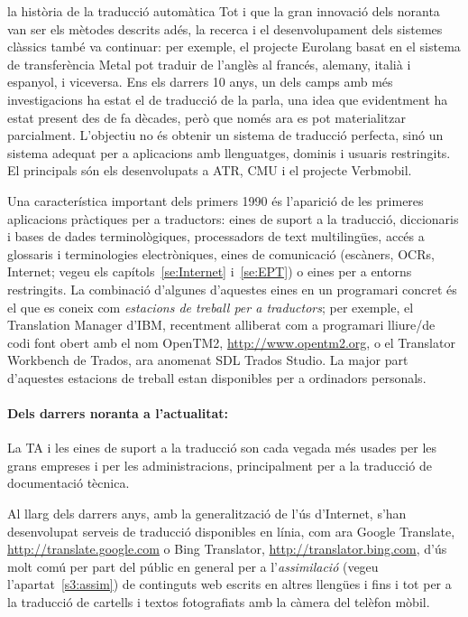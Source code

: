 \begin{persabermes}{la història de la traducció automàtica}
Tot i que la gran innovació dels noranta van ser els mètodes descrits
adés, la recerca i el desenvolupament dels sistemes clàssics també va
continuar: per exemple, el projecte Eurolang basat en el sistema de
transferència Metal pot traduir de l'anglès al francés, alemany,
italià i espanyol, i viceversa.  Ens els darrers 10 anys, un dels
camps amb més investigacions ha estat el de traducció de la parla, una
idea que evidentment ha estat present des de fa dècades, però que
només ara es pot materialitzar parcialment.  L'objectiu no és obtenir
un sistema de traducció perfecta, sinó un sistema adequat per a
aplicacions amb llenguatges, dominis i usuaris restringits. El
principals són els desenvolupats a ATR, CMU i el projecte Verbmobil.

Una característica important dels primers 1990 és l'aparició de les
primeres aplicacions pràctiques per a traductors: eines de suport a la
traducció, diccionaris i bases de dades terminològiques, processadors
de text multilingües, accés a glossaris i terminologies electròniques,
eines de comunicació (escàners, OCRs, Internet; vegeu els
capítols~\ref{se:Internet} i~\ref{se:EPT}) o eines per a entorns
restringits.  La combinació d'algunes d'aquestes eines en un
programari concret és el que es coneix com \emph{estacions de treball
  per a traductors}; per exemple, el Translation Manager d'IBM,
recentment alliberat com a programari lliure/de codi font obert amb el
nom OpenTM2, \url{http://www.opentm2.org}, o el Translator Workbench
de Trados, ara anomenat SDL Trados Studio. La major part d'aquestes estacions
de treball estan disponibles per a ordinadors personals.

\paragraph{Dels darrers noranta a l'actualitat:}

La TA i les eines de suport a la traducció son cada vegada més usades
per les grans empreses i per les administracions, principalment per a
la traducció de documentació tècnica.

Al llarg dels darrers anys, amb la generalització de l'ús d'Internet,
s'han desenvolupat serveis de traducció disponibles en línia, com ara
Google Translate, \url{http://translate.google.com} o Bing Translator,
\url{http://translator.bing.com}, d'ús molt comú per part del públic
en general per a l'\emph{assimilació} (vegeu l'apartat~\ref{s3:assim})
de continguts web escrits en altres llengües i fins i tot per a la
traducció de cartells i textos fotografiats amb la càmera del telèfon
mòbil.


\end{persabermes}
